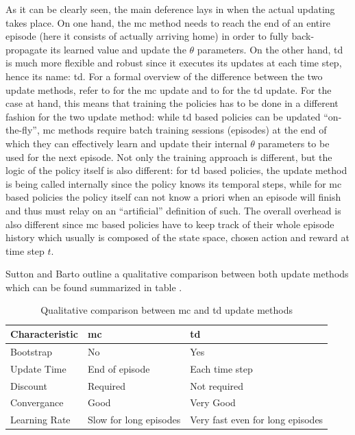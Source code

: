 \documentclass{seal_thesis}
\begin{document}
As it can be clearly seen, the main deference lays in when the actual updating takes place. On one hand, the \gls{mc} method needs to reach the end of an entire episode (\ie here it consists of actually arriving home) in order to fully back-propagate its learned value and update the $\theta$ parameters. On the other hand, \gls{td} is much more flexible and robust since it executes its updates at each time step, hence its name: \gls{td}.
For a formal overview of the difference between the two update methods, refer to  for the \gls{mc} update and to  for the \gls{td} update.
For the case at hand, this means that training the policies has to be done in a different fashion for the two update method: while \gls{td} based policies can be updated ``on-the-fly'', \gls{mc} methods require batch training sessions (\ie episodes) at the end of which they can effectively learn and update their internal $\theta$ parameters to be used for the next episode. Not only the training approach is different, but the logic of the policy itself is also different: for \gls{td} based policies, the update method is being called internally since the policy knows its temporal steps, while for \gls{mc} based policies the policy itself can not know a priori when an episode will finish and thus must relay on an ``artificial'' definition of such. The overall overhead is also different since \gls{mc} based policies have to keep track of their whole episode history which usually is composed of the state space, chosen action and reward at time step $t$.

Sutton and Barto outline a qualitative comparison between both update methods which can be found summarized in table .

\begin{table}[!ht]
\centering
\begin{tabular}{@{}lll@{}}
\toprule
Characteristic & \gls{mc}                     & \gls{td}                               \\ \midrule
Bootstrap      & No                     & Yes                              \\
Update Time    & End of episode         & Each time step                   \\
Discount       & Required               & Not required                     \\
Convergance    & Good                   & Very Good                        \\
Learning Rate  & Slow for long episodes & Very fast even for long episodes \\ \bottomrule
\end{tabular}
\caption{Qualitative comparison between \gls{mc} and \gls{td} update methods \cite[p. 130]{Sutton2017}}
\label{tab:mc_td_comp}
\end{table}
\end{document}
